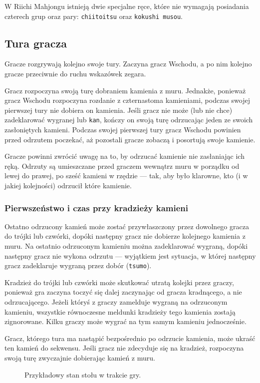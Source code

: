 W Riichi Mahjongu istnieją dwie specjalne ręce, które nie wymagają posiadania
czterech grup oraz pary: \texttt{chiitoitsu} oraz \texttt{kokushi musou}.

\subsection{Tura gracza}
Gracze rozgrywają kolejno swoje tury.
Zaczyna gracz Wschodu, a po nim kolejno gracze przeciwnie do ruchu wskazówek
zegara.

Gracz rozpoczyna swoją turę dobraniem kamienia z muru.
Jednakże, ponieważ gracz Wschodu rozpoczyna rozdanie z czternastoma kamieniami,
podczas swojej pierwszej tury nie dobiera on kamienia.
Jeśli gracz nie może (lub nie chce) zadeklarować wygranej lub \texttt{kan},
kończy on swoją turę odrzucając jeden ze swoich zasłoniętych kamieni.
Podczas swojej pierwszej tury gracz Wschodu powinien przed odrzutem poczekać, aż
pozostali gracze zobaczą i posortują swoje kamienie.

Gracze powinni zwrócić uwagę na to, by odrzucać kamienie nie zasłaniając ich
ręką.
Odrzuty są umieszczane przed graczem wewnątrz muru w porządku od lewej do
prawej, po sześć kamieni w rzędzie --- tak, aby było klarowne, kto (i w jakiej
kolejności) odrzucił które kamienie.

\subsubsection{Pierwszeństwo i czas przy kradzieży kamieni}
Ostatno odrzucony kamień może zostać przywłaszczony przez dowolnego gracza do
trójki lub czwórki, dopóki następny gracz nie dobierze kolejnego kamienia z muru.
Na ostatnio odrzuconym kamieniu można zadeklarować wygraną, dopóki następny
gracz nie wykona odrzutu --- wyjątkiem jest sytuacja, w której następny gracz
zadeklaruje wygraną przez dobór (\texttt{tsumo}).

Kradzież do trójki lub czwórki może skutkować utratą kolejki przez graczy,
ponieważ gra zaczyna toczyć się dalej zaczynając od gracza kradnącego, a nie
odrzucającego.
Jeżeli któryś z graczy zamelduje wygraną na odrzuconym kamieniu, wszystkie
równoczesne meldunki kradzieży tego kamienia zostają zignorowane.
Kilku graczy może wygrać na tym samym kamieniu jednocześnie.

Gracz, którego tura ma nastąpić bezpośrednio po odrzucie kamienia, może ukraść
ten kamień do sekwensu.
Jeśli gracz nie zdecyduje się na kradzież, rozpoczyna swoją turę zwyczajnie
dobierając kamień z muru.
\begin{figure}[h]
    \centering
    
    \caption{Przykładowy stan stołu w trakcie gry.}
    \label{fig:table-midgame}
\end{figure}

